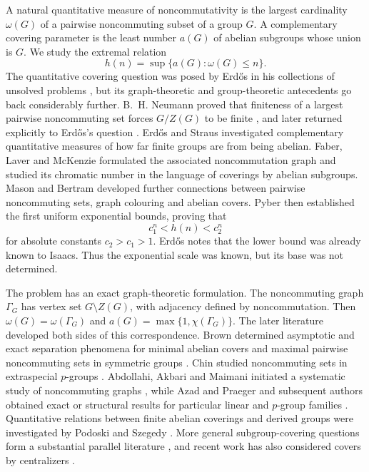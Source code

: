 \documentclass[11pt]{article}
\theoremstyle{definition}
\theoremstyle{remark}
\begin{document}
A natural quantitative measure of noncommutativity is the largest cardinality $\omega(G)$ of a pairwise noncommuting subset of a group $G$. A complementary covering parameter is the least number $a(G)$ of abelian subgroups whose union is $G$. We study the extremal relation
\[
h(n)=\sup\{a(G):\omega(G)\le n\}.
\]
The quantitative covering question was posed by Erd\H{o}s in his collections of unsolved problems \cite{Erdos1990,Erdos1997}, but its graph-theoretic and group-theoretic antecedents go back considerably further. B.~H. Neumann proved that finiteness of a largest pairwise noncommuting set forces $G/Z(G)$ to be finite \cite{Neumann1954}, and later returned explicitly to Erd\H{o}s's question \cite{Neumann1976}. Erd\H{o}s and Straus \cite{ErdosStraus1976} investigated complementary quantitative measures of how far finite groups are from being abelian. Faber, Laver and McKenzie \cite{FaberLaverMcKenzie1978} formulated the associated noncommutation graph and studied its chromatic number in the language of coverings by abelian subgroups. Mason \cite{Mason1978} and Bertram \cite{Bertram1983} developed further connections between pairwise noncommuting sets, graph colouring and abelian covers. Pyber \cite{Pyber1987} then established the first uniform exponential bounds, proving that
\[
c_1^n<h(n)<c_2^n
\]
for absolute constants $c_2>c_1>1$. Erd\H{o}s \cite{Erdos1997} notes that the lower bound was already known to Isaacs. Thus the exponential scale was known, but its base was not determined.

The problem has an exact graph-theoretic formulation. The noncommuting graph $\Gamma_G$ has vertex set $G\setminus Z(G)$, with adjacency defined by noncommutation. Then $\omega(G)=\omega(\Gamma_G)$ and $a(G)=\max\{1,\chi(\Gamma_G)\}$. The later literature developed both sides of this correspondence. Brown determined asymptotic and exact separation phenomena for minimal abelian covers and maximal pairwise noncommuting sets in symmetric groups \cite{Brown1988,Brown1991}. Chin studied noncommuting sets in extraspecial $p$-groups \cite{Chin2005}. Abdollahi, Akbari and Maimani initiated a systematic study of noncommuting graphs \cite{AbdollahiAkbariMaimani2006}, while Azad and Praeger and subsequent authors obtained exact or structural results for particular linear and $p$-group families \cite{AzadPraeger2009,AzadIranmaneshPraegerSpiga2011,FouladiOrfi2011,FouladiOrfi2013,DarafshehGhorbaniPrajapati2015}. Quantitative relations between finite abelian coverings and derived groups were investigated by Podoski and Szegedy \cite{PodoskiSzegedy2002}. More general subgroup-covering questions form a substantial parallel literature \cite{Berkovich2010}, and recent work has also considered covers by centralizers \cite{LewisMcCulloch2026}.
\end{document}
